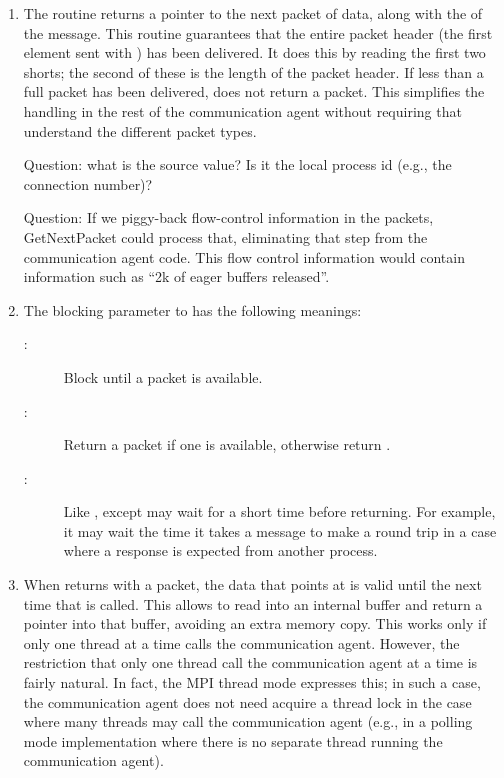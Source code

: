 \begin{enumerate}
\item The routine  returns a pointer to the next packet of
  data, along with the  of the message.  This routine guarantees
  that the entire packet header (the first  element sent with
  ) has been delivered.  It does this by reading the
  first two shorts; the second of these is the length of the packet header.
  If less than a full packet has been delivered,  does not
  return a packet.  This simplifies the handling in the rest of the
  communication agent without requiring that  understand
  the different packet types.

  Question: what is the source value?  Is it the local process id (e.g., the
  connection number)?

  Question: If we piggy-back flow-control information in the packets,
  GetNextPacket could process that, eliminating that step from the
  communication agent code.  This flow control information would contain
  information such as ``2k of eager buffers released''.

\item The blocking parameter to  has the following
  meanings:
  \begin{description}
  \item[:]Block until a packet is available.
  \item[:]Return a packet if one is available, otherwise
    return .
  \item[:]Like , except
     may wait for a short time before returning.  For
    example, it may wait the time it takes a message to make a round trip in a
    case where a response is expected from another process.
  \end{description}

\item When  returns with a packet, the data that
   points at is valid until the next time that
   is called.  This allows  to read
  into an internal buffer and return a pointer into that buffer, avoiding an
  extra memory copy.  This works only if only one thread at a time calls the
  communication agent.  However, the restriction that only one thread call the
  communication agent at a time is fairly natural.  In fact, the MPI thread
  mode  expresses this; in such a case, the
  communication agent does not need acquire a thread lock in the case where
  many threads may call the communication agent (e.g., in a polling mode
  implementation where there is no separate thread running the communication
  agent).


\end{enumerate}
